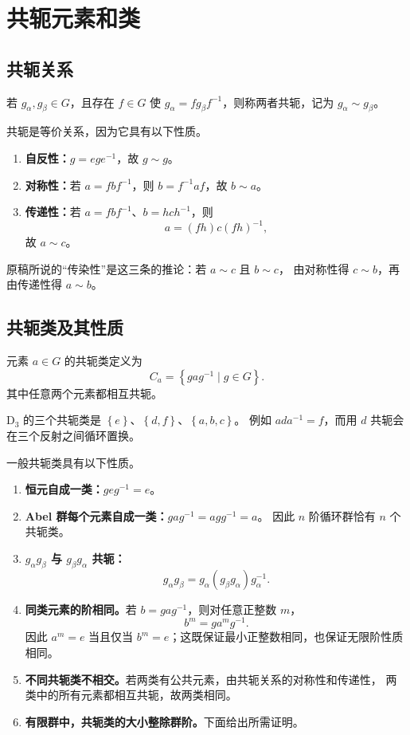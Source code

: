 \section{共轭元素和类}
\subsection{共轭关系}
\begin{definition}[共轭元素]
若 $g_\alpha,g_\beta\in G$，且存在 $f\in G$ 使
$g_\alpha=fg_\beta f^{-1}$，则称两者共轭，记为 $g_\alpha\sim g_\beta$。
\end{definition}
共轭是等价关系，因为它具有以下性质。
\begin{enumerate}
\item \textbf{自反性：}$g=ege^{-1}$，故 $g\sim g$。
\item \textbf{对称性：}若 $a=fbf^{-1}$，则 $b=f^{-1}af$，故 $b\sim a$。
\item \textbf{传递性：}若 $a=fbf^{-1}$、$b=hch^{-1}$，则
\begin{equation}
a=\left(fh\right)c\left(fh\right)^{-1},
\end{equation}
故 $a\sim c$。
\end{enumerate}
原稿所说的“传染性”是这三条的推论：若 $a\sim c$ 且 $b\sim c$，
由对称性得 $c\sim b$，再由传递性得 $a\sim b$。

\subsection{共轭类及其性质}
\begin{definition}[共轭类]
元素 $a\in G$ 的共轭类定义为
\begin{equation}
C_a=\left\{gag^{-1}\mid g\in G\right\}.
\end{equation}
其中任意两个元素都相互共轭。
\end{definition}
$\mathrm{D}_3$ 的三个共轭类是 $\left\{e\right\}$、$\left\{d,f\right\}$、$\left\{a,b,c\right\}$。
例如 $ada^{-1}=f$，而用 $d$ 共轭会在三个反射之间循环置换。

一般共轭类具有以下性质。
\begin{enumerate}
\item \textbf{恒元自成一类：}$geg^{-1}=e$。
\item \textbf{Abel 群每个元素自成一类：}$gag^{-1}=agg^{-1}=a$。
因此 $n$ 阶循环群恰有 $n$ 个共轭类。
\item \textbf{$g_\alpha g_\beta$ 与 $g_\beta g_\alpha$ 共轭：}
\begin{equation}
g_\alpha g_\beta=g_\alpha\left(g_\beta g_\alpha\right)g_\alpha^{-1}.
\end{equation}
\item \textbf{同类元素的阶相同。}若 $b=gag^{-1}$，则对任意正整数 $m$，
\begin{equation}
b^m=ga^mg^{-1}.
\end{equation}
因此 $a^m=e$ 当且仅当 $b^m=e$；这既保证最小正整数相同，也保证无限阶性质相同。
\item \textbf{不同共轭类不相交。}若两类有公共元素，由共轭关系的对称性和传递性，
两类中的所有元素都相互共轭，故两类相同。
\item \textbf{有限群中，共轭类的大小整除群阶。}下面给出所需证明。
\end{enumerate}


